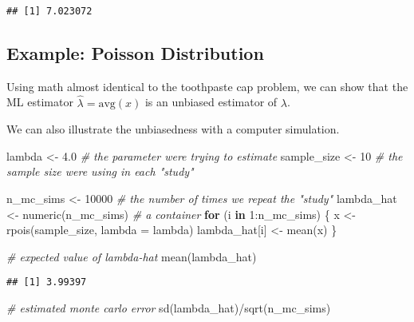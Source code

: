 \documentclass[
]{book}
\newenvironment{Shaded}{\begin{snugshade}}{\end{snugshade}}
\newcommand{\AttributeTok}[1]{\textcolor[rgb]{0.77,0.63,0.00}{#1}}
\newcommand{\CommentTok}[1]{\textcolor[rgb]{0.56,0.35,0.01}{\textit{#1}}}
\newcommand{\ControlFlowTok}[1]{\textcolor[rgb]{0.13,0.29,0.53}{\textbf{#1}}}
\newcommand{\DecValTok}[1]{\textcolor[rgb]{0.00,0.00,0.81}{#1}}
\newcommand{\FloatTok}[1]{\textcolor[rgb]{0.00,0.00,0.81}{#1}}
\newcommand{\FunctionTok}[1]{\textcolor[rgb]{0.00,0.00,0.00}{#1}}
\newcommand{\NormalTok}[1]{#1}
\newcommand{\OtherTok}[1]{\textcolor[rgb]{0.56,0.35,0.01}{#1}}
\newcommand{\SpecialCharTok}[1]{\textcolor[rgb]{0.00,0.00,0.00}{#1}}
\begin{document}
\begin{verbatim}
## [1] 7.023072
\end{verbatim}

\hypertarget{example-poisson-distribution-1}{%
\subsection{Example: Poisson
Distribution}\label{example-poisson-distribution-1}}

Using math almost identical to the toothpaste cap problem, we can show
that the ML estimator \(\hat{\lambda} = \text{avg}(x)\) is an unbiased
estimator of \(\lambda\).

We can also illustrate the unbiasedness with a computer simulation.

\begin{Shaded}
\begin{Highlighting}[]
\NormalTok{lambda }\OtherTok{\textless{}{-}} \FloatTok{4.0}      \CommentTok{\# the parameter we\textquotesingle{}re trying to estimate}
\NormalTok{sample\_size }\OtherTok{\textless{}{-}} \DecValTok{10}  \CommentTok{\# the sample size we\textquotesingle{}re using in each "study"}

\NormalTok{n\_mc\_sims }\OtherTok{\textless{}{-}} \DecValTok{10000}  \CommentTok{\# the number of times we repeat the "study"}
\NormalTok{lambda\_hat }\OtherTok{\textless{}{-}} \FunctionTok{numeric}\NormalTok{(n\_mc\_sims)  }\CommentTok{\# a container }
\ControlFlowTok{for}\NormalTok{ (i }\ControlFlowTok{in} \DecValTok{1}\SpecialCharTok{:}\NormalTok{n\_mc\_sims) \{}
\NormalTok{  x }\OtherTok{\textless{}{-}} \FunctionTok{rpois}\NormalTok{(sample\_size, }\AttributeTok{lambda =}\NormalTok{ lambda)}
\NormalTok{  lambda\_hat[i] }\OtherTok{\textless{}{-}} \FunctionTok{mean}\NormalTok{(x)}
\NormalTok{\}}

\CommentTok{\# expected value of lambda{-}hat}
\FunctionTok{mean}\NormalTok{(lambda\_hat)}
\end{Highlighting}
\end{Shaded}

\begin{verbatim}
## [1] 3.99397
\end{verbatim}

\begin{Shaded}
\begin{Highlighting}[]
\CommentTok{\# estimated monte carlo error}
\FunctionTok{sd}\NormalTok{(lambda\_hat)}\SpecialCharTok{/}\FunctionTok{sqrt}\NormalTok{(n\_mc\_sims)}
\end{Highlighting}
\end{Shaded}
\end{document}
